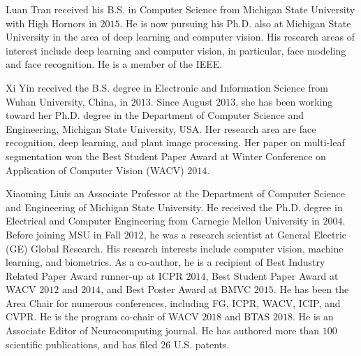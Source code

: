 \documentclass[10pt,journal,compsoc]{IEEEtran}
\begin{document}
\ifCLASSOPTIONcompsoc
\else
\fi



\ifCLASSOPTIONcaptionsoff
  \newpage
\fi









\vspace{-7mm}
\begin{IEEEbiography}{Luan Tran}
received his B.S. in Computer Science from Michigan State University
with High Hornors in $2015$. He is now pursuing his Ph.D. also at Michigan State University in the area of deep learning and computer vision. His research areas of interest include deep learning and computer vision, in particular, face modeling and face recognition. He is a member of the IEEE.
\end{IEEEbiography}
\vspace{-7mm}
\begin{IEEEbiography}{Xi Yin} received the B.S. degree in Electronic and Information Science from Wuhan University, China, in $2013$. Since August $2013$, she has been working toward her Ph.D. degree in the Department of Computer Science and Engineering, Michigan State University, USA. Her research area are face recognition, deep learning, and plant image processing. Her paper on multi-leaf segmentation won the Best Student Paper Award at Winter Conference on Application of Computer Vision (WACV) $2014$. 
\end{IEEEbiography}
\vspace{-7mm}
\begin{IEEEbiography}{Xiaoming Liu}is an Associate Professor at the Department of Computer Science and Engineering of Michigan State University. He received the Ph.D. degree in Electrical and Computer Engineering from Carnegie Mellon University in $2004$. Before joining MSU in Fall $2012$, he was a research scientist at General Electric (GE) Global Research. His research interests include computer vision, machine learning, and biometrics. As a co-author, he is a recipient of Best Industry Related Paper Award runner-up at ICPR $2014$, Best Student Paper Award at WACV $2012$ and $2014$, and Best Poster Award at BMVC $2015$. He has been the Area Chair for numerous conferences, including FG, ICPR, WACV, ICIP, and CVPR. He is the program co-chair of WACV $2018$ and BTAS $2018$. He is an Associate Editor of Neurocomputing journal. He has authored more than $100$ scientific publications, and has filed $26$ U.S. patents. 
\end{IEEEbiography}
\end{document}
